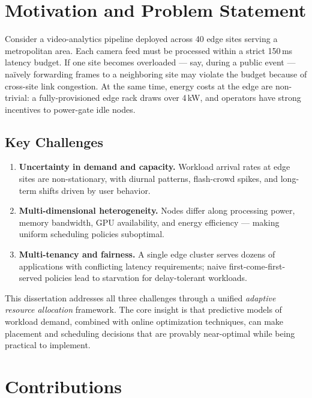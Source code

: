 \documentclass[12pt,oneside]{book}
\begin{document}
\section{Motivation and Problem Statement}

Consider a video-analytics pipeline deployed across 40 edge sites serving a
metropolitan area. Each camera feed must be processed within a strict 150\,ms
latency budget. If one site becomes overloaded --- say, during a public event ---
na\"ively forwarding frames to a neighboring site may violate the budget because
of cross-site link congestion. At the same time, energy costs at the edge are
non-trivial: a fully-provisioned edge rack draws over 4\,kW, and operators have
strong incentives to power-gate idle nodes.

\subsection{Key Challenges}

\begin{enumerate}[label=\textbf{C\arabic*},leftmargin=*]
  \item \textbf{Uncertainty in demand and capacity.} Workload arrival rates at
  edge sites are non-stationary, with diurnal patterns, flash-crowd spikes, and
  long-term shifts driven by user behavior.

  \item \textbf{Multi-dimensional heterogeneity.} Nodes differ along
  processing power, memory bandwidth, GPU availability, and energy efficiency
  --- making uniform scheduling policies suboptimal.

  \item \textbf{Multi-tenancy and fairness.} A single edge cluster serves
  dozens of applications with conflicting latency requirements; naive
  first-come-first-served policies lead to starvation for delay-tolerant
  workloads.
\end{enumerate}

This dissertation addresses all three challenges through a unified
\emph{adaptive resource allocation} framework. The core insight is that
predictive models of workload demand, combined with online optimization
techniques, can make placement and scheduling decisions that are provably
near-optimal while being practical to implement.

\section{Contributions}
\end{document}
